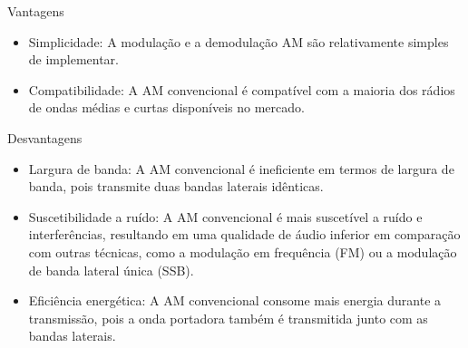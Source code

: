\documentclass[10pt,hyperref={pdfpagemode=FullScreen},aspectratio=169]{beamer}
\begin{document}
\begin{frame}
  \begin{block}{Vantagens}
  \begin{itemize}
      \item Simplicidade: A modulação e a demodulação AM são relativamente simples de implementar.
      \item Compatibilidade: A AM convencional é compatível com a maioria dos rádios de ondas médias e curtas disponíveis no mercado.
  \end{itemize}
  \end{block}
  
  \begin{block}{Desvantagens}
  \begin{itemize}
      \item Largura de banda: A AM convencional é ineficiente em termos de largura de banda, pois transmite duas bandas laterais idênticas.
      \item Suscetibilidade a ruído: A AM convencional é mais suscetível a ruído e interferências, resultando em uma qualidade de áudio inferior em comparação com outras técnicas, como a modulação em frequência (FM) ou a modulação de banda lateral única (SSB).
      \item Eficiência energética: A AM convencional consome mais energia durante a transmissão, pois a onda portadora também é transmitida junto com as bandas laterais.
  \end{itemize}
  \end{block}

\end{frame}
\end{document}
